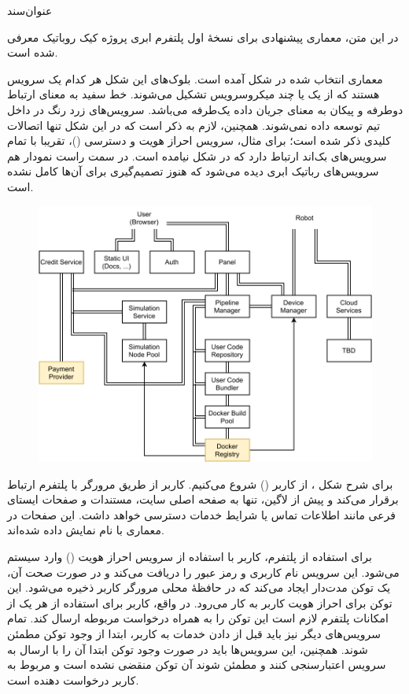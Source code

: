 \documentclass{cake-classes/short-report-fa}
\begin{document}
‌عنوان‌سند

در این متن، معماری پیشنهادی برای نسخهٔ اول پلتفرم ابری پروژه کیک روباتیک معرفی شده است.


معماری انتخاب شده در شکل  آمده است. بلوک‌های این شکل هر کدام یک سرویس هستند که از یک یا چند میکروسرویس تشکیل می‌شوند. خط سفید به معنای ارتباط دوطرفه و پیکان به معنای جریان داده یک‌طرفه می‌باشد. سرویس‌های زرد رنگ در داخل تیم توسعه داده نمی‌شوند.
همچنین، لازم به ذکر است که در این شکل تنها اتصالات کلیدی ذکر شده است؛ برای مثال، سرویس احراز هویت و دسترسی ()، تقریبا با تمام سرویس‌های بک‌اند ارتباط دارد که در شکل نیامده است.
در سمت راست نمودار هم سرویس‌های رباتیک ابری دیده می‌شود که هنوز تصمیم‌گیری برای آن‌ها کامل نشده است.

\begin{figure}[t]
	\centering
	\includegraphics[width=\linewidth]{arch.pdf}
\end{figure}

برای شرح شکل ، از کاربر () شروع می‌کنیم. کاربر از طریق مرورگر با پلتفرم ارتباط برقرار می‌کند و پیش از لاگین، تنها به صفحه‌ اصلی سایت، مستندات و صفحات ایستای فرعی مانند اطلاعات تماس یا شرایط خدمات دسترسی خواهد داشت. این صفحات در معماری با نام  نمایش داده شده‌اند.

برای استفاده از پلتفرم، کاربر با استفاده از سرویس احراز هویت () وارد سیستم می‌شود. این سرویس نام کاربری و رمز عبور را دریافت می‌کند و در صورت صحت آن، یک توکن مدت‌دار ایجاد می‌کند که در حافظهٔ محلی مرورگر کاربر ذخیره می‌شود. این توکن برای احراز هویت کاربر به کار می‌رود. در واقع، کاربر برای استفاده از هر یک از امکانات پلتفرم لازم است این توکن را به همراه درخواست مربوطه ارسال کند. تمام سرویس‌های دیگر نیز باید قبل از دادن خدمات به کاربر، ابتدا از وجود توکن مطمئن شوند. همچنین، این سرویس‌ها باید در صورت وجود توکن ابتدا آن را با ارسال به سرویس  اعتبارسنجی کنند و مطمئن شوند آن توکن منقضی نشده است و مربوط به کاربر درخواست دهنده است.
\end{document}
